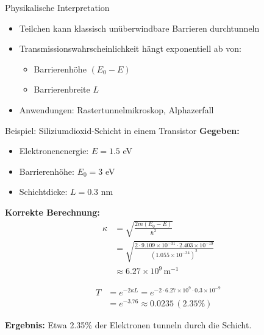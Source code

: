 \documentclass{beamer}
\begin{document}
    \begin{frame}{Physikalische Interpretation}
        \begin{itemize}
            \item Teilchen kann klassisch unüberwindbare Barrieren durchtunneln
            \item Transmissionswahrscheinlichkeit hängt exponentiell ab von:
            \begin{itemize}
                \item Barrierenhöhe $(E_0 - E)$
                \item Barrierenbreite $L$
            \end{itemize}
            \item Anwendungen: Rastertunnelmikroskop, Alphazerfall
        \end{itemize}
    \end{frame}



    \begin{frame}{Beispiel: Siliziumdioxid-Schicht in einem Transistor}
        \textbf{Gegeben:}
        \begin{itemize}
            \item Elektronenenergie: $E = 1.5$ eV
            \item Barrierenhöhe: $E_0 = 3$ eV
            \item Schichtdicke: $L = 0.3$ nm
        \end{itemize}

        \textbf{Korrekte Berechnung:}
        \begin{align*}
            \kappa &= \sqrt{\frac{2m(E_0 - E)}{\hbar^2}} \\
            &= \sqrt{\frac{2 \cdot 9.109 \times 10^{-31} \cdot 2.403 \times 10^{-19}}{(1.055 \times 10^{-34})^2}} \\
            &\approx 6.27 \times 10^9 \, \text{m}^{-1}
        \end{align*}

        \begin{align*}
            T &= e^{-2 \kappa L} = e^{-2 \cdot 6.27 \times 10^9 \cdot 0.3 \times 10^{-9}} \\
            &= e^{-3.76} \approx 0.0235 \, (2.35\%)
        \end{align*}

        \textbf{Ergebnis:} Etwa 2.35\% der Elektronen tunneln durch die Schicht.
    \end{frame}
\end{document}
